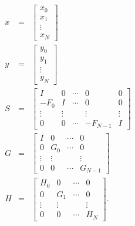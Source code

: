 \begin{eqnarray}
x&=&\left[\begin{array}{c}
x_0\\
x_1\\
\vdots\\
x_N\end{array}\right]\nonumber\\
y&=&\left[\begin{array}{c}
y_0\\
y_1\\
\vdots\\
y_N\end{array}\right]\nonumber\\
S&=&\left[\begin{array}{ccccc}
I&0&\cdots&0&0\\
-F_0&I&\cdots&0&0\\
\vdots&\vdots&&\vdots&\vdots\\
0&0&\cdots&-F_{N-1}&I\end{array}\right]\nonumber\\
G&=&\left[\begin{array}{cccc}
I&0&\cdots&0\\
0&G_0&\cdots&0\\
\vdots&\vdots&&\vdots\\
0&0&\cdots&G_{N-1}\end{array}\right]\nonumber\\
H&=&\left[\begin{array}{cccc}
H_0&0&\cdots&0\\
0&G_1&\cdots&0\\
\vdots&\vdots&&\vdots\\
0&0&\cdots&H_N\end{array}\right].
\label{e.wf6a}
\end{eqnarray}
%

